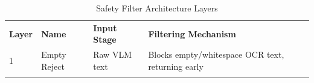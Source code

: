 \documentclass[12pt,a4paper,oneside]{report}
\begin{document}
\begin{longtable}[]{@{}
  >{\raggedright\arraybackslash}p{}
  >{\raggedright\arraybackslash}p{}
  >{\raggedright\arraybackslash}p{}
  >{\raggedright\arraybackslash}p{}@{}}
\caption{Safety Filter Architecture Layers\label{tab:table7}}\\

\toprule\noalign{}
\begin{minipage}[b]{\linewidth}\raggedright

\textbf{Layer}

\end{minipage} & \begin{minipage}[b]{\linewidth}\raggedright

\textbf{Name}

\end{minipage} & \begin{minipage}[b]{\linewidth}\raggedright

\textbf{Input Stage}

\end{minipage} & \begin{minipage}[b]{\linewidth}\raggedright

\textbf{Filtering Mechanism}

\end{minipage} \\
\begin{minipage}[b]{\linewidth}\raggedright

1

\end{minipage} & \begin{minipage}[b]{\linewidth}\raggedright

Empty Reject

\end{minipage} & \begin{minipage}[b]{\linewidth}\raggedright

Raw VLM text

\end{minipage} & \begin{minipage}[b]{\linewidth}\raggedright

Blocks empty/whitespace OCR text, returning early

\end{minipage} \\
\begin{minipage}[b]{\linewidth}\raggedright
\end{minipage} & \begin{minipage}[b]{\linewidth}\raggedright
\end{minipage} & \begin{minipage}[b]{\linewidth}\raggedright
\end{minipage} & \begin{minipage}[b]{\linewidth}\raggedright


\end{minipage}
\end{longtable}
\end{document}
